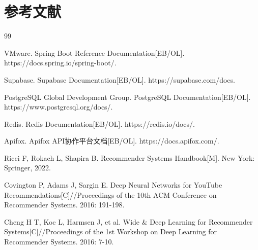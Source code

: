 
\chapter*{参考文献}

\begin{thebibliography}{99}

VMware. Spring Boot Reference Documentation[EB/OL]. https://docs.spring.io/spring-boot/.

Supabase. Supabase Documentation[EB/OL]. https://supabase.com/docs.

PostgreSQL Global Development Group. PostgreSQL Documentation[EB/OL]. https://www.postgresql.org/docs/.

Redis. Redis Documentation[EB/OL]. https://redis.io/docs/.

Apifox. Apifox API协作平台文档[EB/OL]. https://docs.apifox.com/.

Ricci F, Rokach L, Shapira B. Recommender Systems Handbook[M]. New York: Springer, 2022.

Covington P, Adams J, Sargin E. Deep Neural Networks for YouTube Recommendations[C]//Proceedings of the 10th ACM Conference on Recommender Systems. 2016: 191-198.

Cheng H T, Koc L, Harmsen J, et al. Wide \& Deep Learning for Recommender Systems[C]//Proceedings of the 1st Workshop on Deep Learning for Recommender Systems. 2016: 7-10.

\end{thebibliography}
